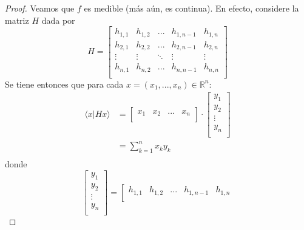 \documentclass[12pt]{report}
\theoremstyle{largebreak}
\newcommand\pint[2]{\ensuremath{\langle#1| #2\rangle}}
\begin{document}
    \begin{proof}
        Veamos que $f$ es medible (más aún, es continua). En efecto, considere la matriz $H$ dada por
        \begin{equation*}
            H=\left[\begin{array}{ccccc}
                h_{1,1} & h_{1,2} & ... & h_{1,n-1} & h_{1,n}\\
                h_{2,1} & h_{2,2} & ... & h_{2,n-1} & h_{2,n}\\
                \vdots & \vdots & \ddots & \vdots & \vdots \\
                h_{n,1} & h_{n,2} & ... & h_{n,n-1} & h_{n,n}\\
            \end{array}\right]
        \end{equation*}
        Se tiene entonces que para cada $x=(x_1,...,x_n)\in\mathbb{R}^n$:
        \begin{equation*}
            \begin{split}
                \pint{x}{Hx}&=\left[
                    \begin{array}{cccc}
                        x_1 & x_2 & ... & x_n\\
                    \end{array}
                \right]\cdot\left[\begin{array}{c}
                    y_1\\
                    y_2\\
                    \vdots\\
                    y_n\\
                \end{array}\right]\\
                &=\sum_{ k=1}^n x_ky_k\\
            \end{split}
        \end{equation*}
        donde
        \begin{equation*}
            \left[\begin{array}{c}
                y_1\\
                y_2\\
                \vdots\\
                y_n\\
            \end{array}\right]=\left[\begin{array}{ccccc}
                h_{1,1} & h_{1,2} & ... & h_{1,n-1} & h_{1,n}\\

\end{array}
\end{equation*}
\end{proof}
\end{document}
